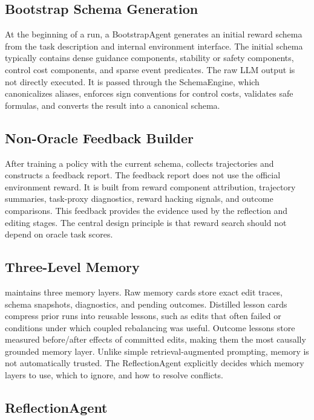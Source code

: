 \subsection{Bootstrap Schema Generation}

At the beginning of a run, a BootstrapAgent generates an initial reward schema from the task description and internal environment interface. The initial schema typically contains dense guidance components, stability or safety components, control cost components, and sparse event predicates. The raw LLM output is not directly executed. It is passed through the SchemaEngine, which canonicalizes aliases, enforces sign conventions for control costs, validates safe formulas, and converts the result into a canonical schema.

\subsection{Non-Oracle Feedback Builder}

After training a policy with the current schema, \methodname{} collects trajectories and constructs a feedback report. The feedback report does not use the official environment reward. It is built from reward component attribution, trajectory summaries, task-proxy diagnostics, reward hacking signals, and outcome comparisons. This feedback provides the evidence used by the reflection and editing stages. The central design principle is that reward search should not depend on oracle task scores.

\subsection{Three-Level Memory}

\methodname{} maintains three memory layers. Raw memory cards store exact edit traces, schema snapshots, diagnostics, and pending outcomes. Distilled lesson cards compress prior runs into reusable lessons, such as edits that often failed or conditions under which coupled rebalancing was useful. Outcome lessons store measured before/after effects of committed edits, making them the most causally grounded memory layer. Unlike simple retrieval-augmented prompting, memory is not automatically trusted. The ReflectionAgent explicitly decides which memory layers to use, which to ignore, and how to resolve conflicts.

\subsection{ReflectionAgent}

